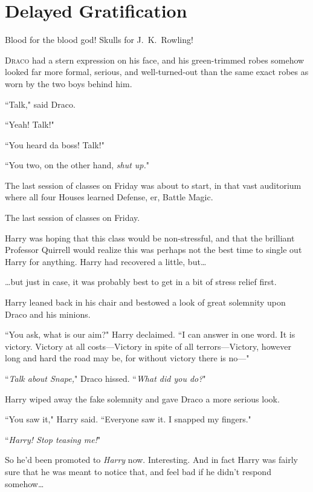 \chapter{Delayed Gratification}

\begin{chapterOpeningAuthorNote}
Blood for the blood god! Skulls for J.~K.~Rowling!
\end{chapterOpeningAuthorNote}

\lettrine{D}{raco} had a stern expression on his face, and his green-trimmed robes somehow looked far more formal, serious, and well-turned-out than the same exact robes as worn by the two boys behind him.

``Talk," said Draco.

``Yeah! Talk!"

``You heard da boss! Talk!"

``You two, on the other hand, \emph{shut up.}"

The last session of classes on Friday was about to start, in that vast auditorium where all four Houses learned Defense, er, Battle Magic.

The last session of classes on Friday.

Harry was hoping that this class would be non-stressful, and that the brilliant Professor Quirrell would realize this was perhaps not the best time to single out Harry for anything. Harry had recovered a little, but{\ldots}

{\ldots}but just in case, it was probably best to get in a bit of stress relief first.

Harry leaned back in his chair and bestowed a look of great solemnity upon Draco and his minions.

``You ask, what is our aim?" Harry declaimed. ``I can answer in one word. It is victory. Victory at all costs—Victory in spite of all terrors—Victory, however long and hard the road may be, for without victory there is no—"

``\emph{Talk about Snape,}" Draco hissed. ``\emph{What did you do?}"

Harry wiped away the fake solemnity and gave Draco a more serious look.

``You saw it," Harry said. ``Everyone saw it. I snapped my fingers."

``\emph{Harry! Stop teasing me!}"

So he'd been promoted to \emph{Harry} now. Interesting. And in fact Harry was fairly sure that he was meant to notice that, and feel bad if he didn't respond somehow{\ldots}

